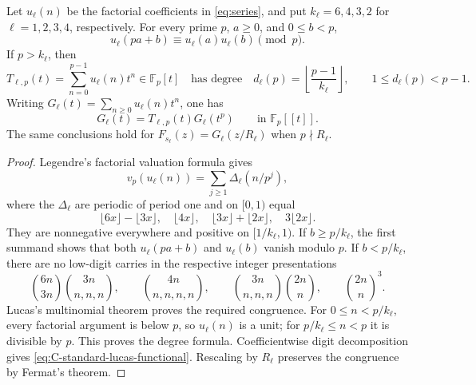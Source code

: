 \begin{proposition}
\label{prop:C-standard-lucas}
Let $u_\ell(n)$ be the factorial coefficients in \eqref{eq:series},
and put $k_\ell=6,4,3,2$ for $\ell=1,2,3,4$, respectively.
For every prime $p$, $a\geq0$, and $0\leq b<p$,
\[
 u_\ell(pa+b)\equiv u_\ell(a)u_\ell(b)\pmod p.
\]
If $p>k_\ell$, then
\[
 T_{\ell,p}(t)=\sum_{n=0}^{p-1}u_\ell(n)t^n\in\mathbb F_p[t]
 \quad\text{has degree}\quad
 d_\ell(p)=\left\lfloor\frac{p-1}{k_\ell}\right\rfloor,
 \qquad 1\leq d_\ell(p)<p-1.
\]
Writing $G_\ell(t)=\sum_{n\geq0}u_\ell(n)t^n$, one has
\begin{equation}\label{eq:C-standard-lucas-functional}
 G_\ell(t)=T_{\ell,p}(t)G_\ell(t^p)
 \qquad\text{in }\mathbb F_p[[t]].
\end{equation}
The same conclusions hold for $F_{s_\ell}(z)=G_\ell(z/R_\ell)$
when $p\nmid R_\ell$.
\end{proposition}
\begin{proof}
Legendre's factorial valuation formula gives
\[
 v_p(u_\ell(n))=\sum_{j\geq1}\Delta_\ell(n/p^j),
\]
where the $\Delta_\ell$ are periodic of period one and on $[0,1)$ equal
\[
 \lfloor6x\rfloor-\lfloor3x\rfloor,\quad
 \lfloor4x\rfloor,\quad
 \lfloor3x\rfloor+\lfloor2x\rfloor,\quad
 3\lfloor2x\rfloor.
\]
They are nonnegative everywhere and positive on $[1/k_\ell,1)$.
If $b\geq p/k_\ell$, the first summand shows that both
$u_\ell(pa+b)$ and $u_\ell(b)$ vanish modulo $p$.
If $b<p/k_\ell$, there are no low-digit carries in the respective
integer presentations
\[
 \binom{6n}{3n}\binom{3n}{n,n,n},\qquad
 \binom{4n}{n,n,n,n},\qquad
 \binom{3n}{n,n,n}\binom{2n}{n},\qquad
 \binom{2n}{n}^{\!3}.
\]
Lucas's multinomial theorem proves the required congruence.
For $0\leq n<p/k_\ell$, every factorial argument is below $p$,
so $u_\ell(n)$ is a unit; for $p/k_\ell\leq n<p$ it is divisible
by $p$. This proves the degree formula. Coefficientwise digit
decomposition gives \eqref{eq:C-standard-lucas-functional}.
Rescaling by $R_\ell$ preserves the congruence by Fermat's theorem.
\end{proof}

